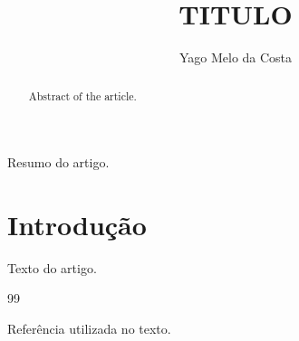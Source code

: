 \documentclass[12pt]{article}
\title{{TITULO}}
\author{Yago Melo da Costa}
\begin{document}
\maketitle

\begin{resumo}
Resumo do artigo.
\end{resumo}

\begin{abstract}
Abstract of the article.
\end{abstract}

\section{Introdução}

Texto do artigo.

\begin{thebibliography}{99}

Referência utilizada no texto.

\end{thebibliography}
\end{document}
